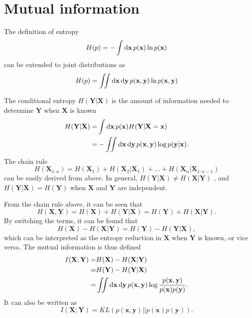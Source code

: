 \section{Mutual information\label{Sec:Eva:MI}}
The definition of entropy
\begin{equation}
	H(p)=-\int \mathop{}\!\mathrm{d} \mathbf{x}\, p(\mathbf{x})\ln p(\mathbf{x})
\end{equation}
can be extended to joint distributions as
\begin{equation}
	H(p)=\iint \mathop{}\!\mathrm{d} \mathbf{x}\mathop{}\!\mathrm{d} \mathbf{y}\, p(\mathbf{x},\mathbf{y})\ln p(\mathbf{x},\mathbf{y})
\end{equation}

The conditional entropy $H(\mathbf{Y}|\mathbf{X})$ is the amount of information needed to determine $\mathbf{Y}$ when $\mathbf{X}$ is known
\begin{align}
	H(\mathbf{Y}|\mathbf{X})=&\int \mathop{}\!\mathrm{d} \mathbf{x}\, p(\mathbf{x})  H(\mathbf{Y}|\mathbf{X}=\mathbf{x})\notag\\
	  =&-\iint \mathop{}\!\mathrm{d} \mathbf{x}\mathop{}\!\mathrm{d} \mathbf{y}\, p(\mathbf{x},\mathbf{y})\log{p(\mathbf{y}|\mathbf{x})}.
\end{align}
The chain rule
\begin{equation}
	H(\mathbf{X}_{1:n})=H(\mathbf{X}_1)+H(\mathbf{X}_2|\mathbf{X}_1)+\dots+H(\mathbf{X}_n|\mathbf{X}_{1:n-1})
\end{equation}
can be easily derived from above. In general, $H(\mathbf{Y}|\mathbf{X})\neq H(\mathbf{X}|\mathbf{Y})$ , and $H(\mathbf{Y}|\mathbf{X})=H(\mathbf{Y})$ when $\mathbf{X}$ and $\mathbf{Y}$ are independent.

From the chain rule above, it can be seen that
\begin{equation}
	H(\mathbf{X},\mathbf{Y})=H(\mathbf{X})+H(\mathbf{Y}|\mathbf{X})=H(\mathbf{Y})+H(\mathbf{X}|\mathbf{Y}).
\end{equation}
By switching the terms, it can be found that
\begin{equation}
	H(\mathbf{X})-H(\mathbf{X}|\mathbf{Y})=H(\mathbf{Y})-H(\mathbf{Y}|\mathbf{X}),
\end{equation}
which can be interpreted as the entropy reduction in $\mathbf{X}$ when $\mathbf{Y}$ is known, or vice versa. The mutual information is thus defined
\begin{align}
	I(\mathbf{X};\mathbf{Y})=&H(\mathbf{X})-H(\mathbf{X}|\mathbf{Y})\notag\\
	=&H(\mathbf{Y})-H(\mathbf{Y}|\mathbf{X})\notag\\
	=&\iint \mathop{}\!\mathrm{d} \mathbf{x}\mathop{}\!\mathrm{d} \mathbf{y}\, p(\mathbf{x},\mathbf{y})\log{\frac{p(\mathbf{x},\mathbf{y})}{p(\mathbf{x})p(\mathbf{y})}}.
\end{align}
It can also be written as
\begin{equation}
	I(\mathbf{X};\mathbf{Y})=KL\left(p(\mathbf{x},\mathbf{y})||p(\mathbf{x})p(\mathbf{y})\right).
\end{equation}
